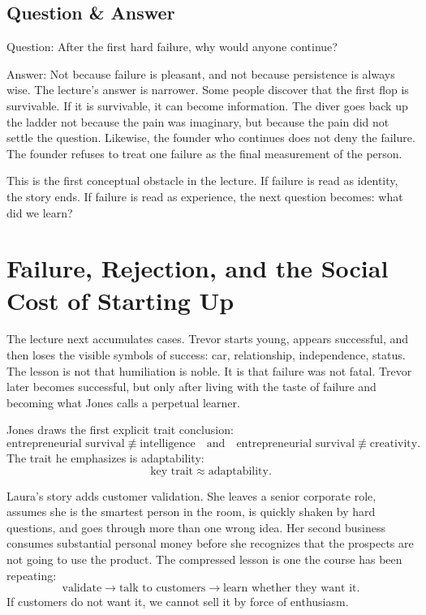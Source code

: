 \subsection{Question \& Answer}

Question: After the first hard failure, why would anyone continue?

Answer: Not because failure is pleasant, and not because persistence is always wise. The lecture's answer is narrower. Some people discover that the first flop is survivable. If it is survivable, it can become information. The diver goes back up the ladder not because the pain was imaginary, but because the pain did not settle the question. Likewise, the founder who continues does not deny the failure. The founder refuses to treat one failure as the final measurement of the person.

This is the first conceptual obstacle in the lecture. If failure is read as identity, the story ends. If failure is read as experience, the next question becomes: what did we learn?

\section{Failure, Rejection, and the Social Cost of Starting Up}

The lecture next accumulates cases. Trevor starts young, appears successful, and then loses the visible symbols of success: car, relationship, independence, status. The lesson is not that humiliation is noble. It is that failure was not fatal. Trevor later becomes successful, but only after living with the taste of failure and becoming what Jones calls a perpetual learner.

Jones draws the first explicit trait conclusion:
\begin{equation}
\text{entrepreneurial survival}
\not\equiv
\text{intelligence}
\quad\text{and}\quad
\text{entrepreneurial survival}
\not\equiv
\text{creativity}.
\end{equation}
The trait he emphasizes is adaptability:
\begin{equation}
\text{key trait} \approx \text{adaptability}.
\end{equation}

Laura's story adds customer validation. She leaves a senior corporate role, assumes she is the smartest person in the room, is quickly shaken by hard questions, and goes through more than one wrong idea. Her second business consumes substantial personal money before she recognizes that the prospects are not going to use the product. The compressed lesson is one the course has been repeating:
\begin{equation}
\text{validate}
\longrightarrow
\text{talk to customers}
\longrightarrow
\text{learn whether they want it}.
\end{equation}
If customers do not want it, we cannot sell it by force of enthusiasm.

